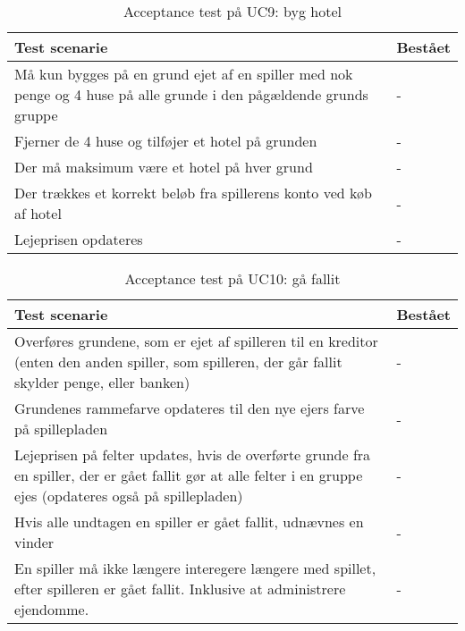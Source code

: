 \documentclass[class=article, crop=false]{standalone}
\begin{document}
    \begin{table}[H]
        \caption{Acceptance test på UC9: byg hotel}
        \begin{tabularx}{\textwidth}{|X|l|}
            \hline
            \textbf{Test scenarie}       & \textbf{Bestået}   \\ \hline
            Må kun bygges på en grund ejet af en spiller med nok penge og 4 huse på alle grunde i den pågældende grunds gruppe     & - \\ \hline
            Fjerner de 4 huse og tilføjer et hotel på grunden     & -\\ \hline
            Der må maksimum være et hotel på hver grund     & -\\ \hline
            Der trækkes et korrekt beløb fra spillerens konto ved køb af hotel     & -\\ \hline
            Lejeprisen opdateres     & - \\ \hline
        \end{tabularx}
    \end{table}

    \begin{table}[H]
        \caption{Acceptance test på UC10: gå fallit}
        \begin{tabularx}{\textwidth}{|X|l|}
            \hline
            \textbf{Test scenarie}       & \textbf{Bestået}   \\ \hline
            Overføres grundene, som er ejet af spilleren til en kreditor (enten den anden spiller, som spilleren, der går fallit skylder penge, eller banken) & - \\ \hline
            Grundenes rammefarve opdateres til den nye ejers farve på spillepladen & -\\ \hline
            Lejeprisen på felter updates, hvis de overførte grunde fra en spiller, der er gået fallit gør at alle felter i en gruppe ejes (opdateres også på spillepladen) & -\\ \hline
            Hvis alle undtagen en spiller er gået fallit, udnævnes en vinder& -\\ \hline
            En spiller må ikke længere interegere længere med spillet, efter spilleren er gået fallit. Inklusive at administrere ejendomme.& - \\ \hline
        \end{tabularx}
    \end{table}
\end{document}
